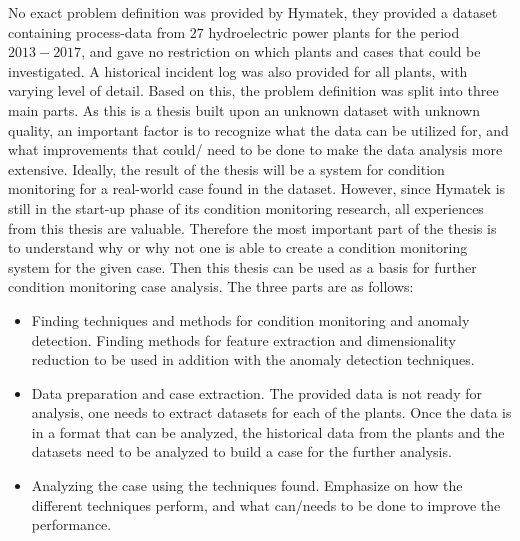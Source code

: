 
No exact problem definition was provided by Hymatek, they provided a dataset containing process-data from $27$ hydroelectric power plants for the period $2013-2017$, and gave no restriction on which plants and cases that could be investigated. A historical incident log was also provided for all plants, with varying level of detail. Based on this, the problem definition was split into three main parts. As this is a thesis built upon an unknown dataset with unknown quality, an important factor is to recognize what the data can be utilized for, and what improvements that could/ need to be done to make the data analysis more extensive. Ideally, the result of the thesis will be a system for condition monitoring for a real-world case found in the dataset. However, since Hymatek is still in the start-up phase of its condition monitoring research, all experiences from this thesis are valuable. Therefore the most important part of the thesis is to understand why or why not one is able to create a condition monitoring system for the given case. Then this thesis can be used as a basis for further condition monitoring case analysis. The three parts are as follows: 

\begin{itemize}
    \item Finding techniques and methods for condition monitoring and anomaly detection. Finding methods for feature extraction and dimensionality reduction to be used in addition with the anomaly detection techniques.
    \item Data preparation and case extraction. The provided data is not ready for analysis, one needs to extract datasets for each of the plants. Once the data is in a format that can be analyzed, the historical data from the plants and the datasets need to be analyzed to build a  case for the further analysis. 
    \item Analyzing the case using the techniques found. Emphasize on how the different techniques perform, and what can/needs to be done to improve the performance. 
\end{itemize}



